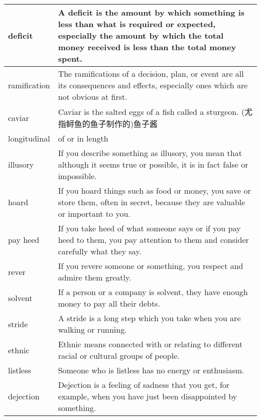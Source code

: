 \documentclass{article}
\begin{document}
\begin{center}
\begin{longtable}{|l|p{7.8cm}|}
\hline
deficit
&
A deficit is the amount by which something is less than what is required or expected, especially the amount by which the total money received is less than the total money spent.
\\

\hline
ramification
&
The ramifications of a decision, plan, or event are all its consequences and effects, especially ones which are not obvious at first.
\\

\hline
caviar
&
Caviar is the salted eggs of a fish called a sturgeon. (尤指鲟鱼的鱼子制作的)鱼子酱
\\

\hline
longitudinal
&
of or in length
\\

\hline
illusory
&
If you describe something as illusory, you mean that although it seems true or possible, it is in fact false or impossible.
\\

\hline
hoard
&
If you hoard things such as food or money, you save or store them, often in secret, because they are valuable or important to you.
\\

\hline
pay heed
&
If you take heed of what someone says or if you pay heed to them, you pay attention to them and consider carefully what they say.
\\

\hline
rever
&
If you revere someone or something, you respect and admire them greatly.
\\

\hline
solvent
&
If a person or a company is solvent, they have enough money to pay all their debts.
\\

\hline
stride
&
A stride is a long step which you take when you are walking or running.
\\

\hline
ethnic
&
Ethnic means connected with or relating to different racial or cultural groups of people.
\\

\hline
listless
&
Someone who is listless has no energy or enthusiasm.
\\

\hline
dejection
&
Dejection is a feeling of sadness that you get, for example, when you have just been disappointed by something.
\\


\end{longtable}
\end{center}
\end{document}
